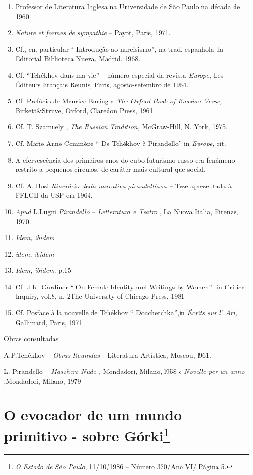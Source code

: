 \begin{enumerate}
\def\labelenumi{\arabic{enumi}.}
\item
  Professor de Literatura Inglesa na Universidade de São Paulo na década
  de 1960.
\item
  \emph{Nature et formes de sympathie} -- Payot, Paris, 1971.
\item
  Cf., em particular `` Introdução ao narcisismo'', na trad. espanhola
  da Editorial Biblioteca Nueva, Madrid, 1968.
\item
  Cf. ``Tchékhov dans ma vie'' -- número especial da revista
  \emph{Europe,} Les Éditeurs Français Reunis, Paris, agosto-setembro de
  1954.
\item
  Cf. Prefácio de Maurice Baring a \emph{The Oxford Book of Russian
  Verse,} Birkett\&Struve, Oxford, Claredon Press, 1961.
\item
  Cf. T. Szamuely , \emph{The Russian Tradition,} McGraw-Hill, N. York,
  1975.
\item
  Cf. Marie Anne Commène `` De Tchékhov à Pirandello'' in \emph{Europe},
  cit.
\item
  A efervescência dos primeiros anos do cubo-futurismo russo era
  fenômeno restrito a pequenos círculos, de caráter mais cultural que
  social.
\item
  Cf. A. Bosi \emph{Itinerário della narrativa pirandelliana --} Tese
  apresentada à FFLCH da USP em 1964.
\item
  \emph{Apud} L.Lugni \emph{Pirandello -- Letteratura e Teatro} , La
  Nuova Italia, Firenze, 1970.
\item
  \emph{Idem, ibidem}
\item
  \emph{idem, ibidem}
\item
  \emph{Idem, ibidem}. p.15
\item
  Cf. J.K. Gardiner `` On Female Identity and Writings by Women''- in
  Critical Inquiry, vol.8, n. 2The \textbar{}University of Chicago
  Press, 1981
\item
  Cf. Posface à la nouvelle de Tchékhov `` Douchetchka'',in \emph{Écrits
  sur l' Art,} Gallimard, Paris, 1971
\end{enumerate}

Obras consultadas

A.P.Tchékhov -- \emph{Obras Reunidas} -- Literatura Artística, Moscou,
l961.

L. Pirandello -- \emph{Maschere Nude ,} Mondadori, Milano, l958 e
\emph{Novelle per un anno ,}Mondadori, Milano, 1979

\chapter{O evocador de um mundo primitivo - sobre Górki\footnote{\emph{O
  Estado de São Paulo}, 11/10/1986 -- Número 330/Ano VI/ Página 5.}}

